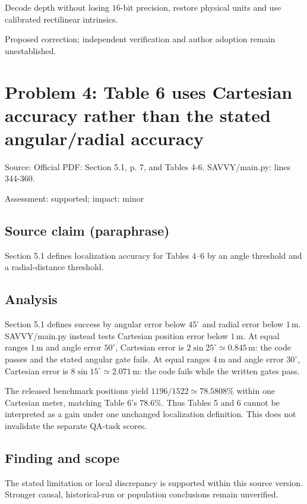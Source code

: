 \documentclass[11pt]{article}
\begin{document}
Decode depth without losing \(16\)-bit precision, restore physical units and use calibrated rectilinear intrinsics.

Proposed correction; independent verification and author adoption remain unestablished.

\section*{Problem 4: Table 6 uses Cartesian accuracy rather than the stated angular/radial accuracy}

Source: Official PDF: Section 5.1, p. 7, and Tables 4-6. SAVVY/main.py: lines 344-360.

Assessment: supported; impact: minor

\subsection*{Source claim (paraphrase)}

Section 5.1 defines localization accuracy for Tables 4--6 by an angle threshold and a radial-distance threshold.

\subsection*{Analysis}

Section 5.1 defines success by angular error below \(45^\circ\) and radial error below \(1\,\mathrm m\). SAVVY/main.py instead tests Cartesian position error below \(1\,\mathrm m\). At equal ranges \(1\,\mathrm m\) and angle error \(50^\circ\), Cartesian error is \(2\sin25^\circ\simeq0.845\,\mathrm m\): the code passes and the stated angular gate fails. At equal ranges \(4\,\mathrm m\) and angle error \(30^\circ\), Cartesian error is \(8\sin15^\circ\simeq2.071\,\mathrm m\): the code fails while the written gates pass.

The released benchmark positions yield \(1196/1522\simeq78.5808\%\) within one Cartesian meter, matching Table 6's \(78.6\%\). Thus Tables 5 and \(6\) cannot be interpreted as a gain under one unchanged localization definition. This does not invalidate the separate QA-task scores.

\subsection*{Finding and scope}

The stated limitation or local discrepancy is supported within this source version. Stronger causal, historical-run or population conclusions remain unverified.
\end{document}
